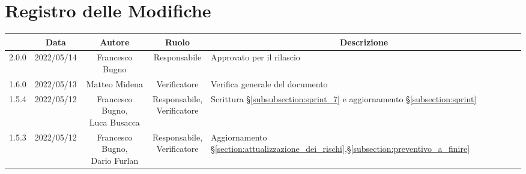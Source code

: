 \thispagestyle{empty}
\section*{Registro delle Modifiche}

\begin{center}
	\renewcommand{\arraystretch}{1.8}
	\begin{longtable}[c]{c | c | c | c | p{5cm}}
		\rowcolor[HTML]{125E28}
		\multicolumn{1}{c}{\color[HTML]{FFFFFF} \textbf{Versione}} &
		\multicolumn{1}{c}{\color[HTML]{FFFFFF} \textbf{Data}}     &
		\multicolumn{1}{c}{\color[HTML]{FFFFFF} \textbf{Autore}}   &
		\multicolumn{1}{c}{\color[HTML]{FFFFFF} \textbf{Ruolo}}    &
		\multicolumn{1}{c}{\color[HTML]{FFFFFF} \textbf{Descrizione}}                                                                                                                                                                                                                 \\
		\endhead
		2.0.0                                                      & 2022/05/14 & Francesco Bugno                        & Responsabile   & Approvato per il rilascio                                                                                                                 \\
		1.6.0                                                      & 2022/05/13 & Matteo Midena                          & Verificatore   & Verifica generale del documento                                                                                                           \\
		1.5.4                                                      & 2022/05/12 & \Shortunderstack{Francesco Bugno,                                                                                                                                                                   \\Luca Busacca} & \Shortunderstack{Responsabile,\\Verificatore} & Scrittura §\ref{subsubsection:sprint_7} e aggiornamento §\ref{subsection:sprint}\\
		1.5.3                                                      & 2022/05/12 & \Shortunderstack{Francesco Bugno,                                                                                                                                                                   \\Dario Furlan} & \Shortunderstack{Responsabile,\\Verificatore} & Aggiornamento §\ref{section:attualizzazione_dei_rischi},§\ref{subsection:preventivo_a_finire}\\

\end{longtable}
\end{center}

